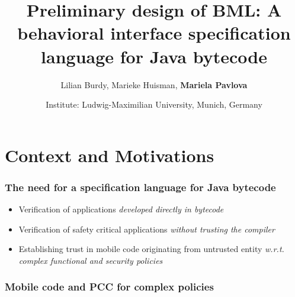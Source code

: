 \documentclass[c]{beamer}
\title[]{Preliminary design of BML: A behavioral interface specification language for Java bytecode }
\author[mariela.pavlova@sophia.inria.fr]{Lilian Burdy, Marieke Huisman, \textbf{Mariela Pavlova}}
\date[]{Institute:  Ludwig-Maximilian University, Munich, Germany }
\begin{document}
\begin{frame}
\titlepage
\end{frame}
 




\section{Context and Motivations}


\begin{frame}\frametitle{The need for a specification language  for Java bytecode }

\begin{itemize}
 \item Verification of applications  \textit{developed directly in bytecode}
 \item Verification of safety critical applications 
   \textit{ without trusting the compiler}
 \item Establishing trust in mobile code originating from untrusted entity \textit{w.r.t. complex functional and security policies}
\end{itemize}

\end{frame}

\logo{}
\begin{frame}[shrink]\frametitle{Mobile code and  PCC for complex policies }  

\end{frame}

\end{document}
